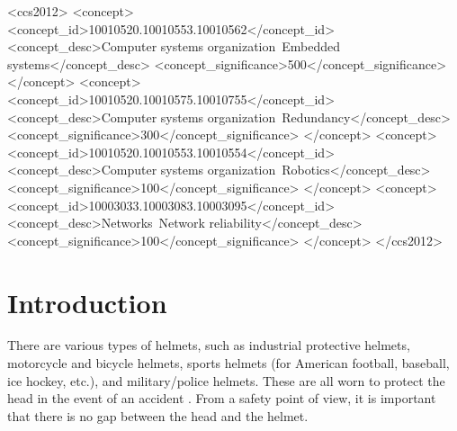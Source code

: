 \documentclass[sigconf,authordraft]{acmart}
\begin{document}
\begin{CCSXML}
<ccs2012>
 <concept>
  <concept_id>10010520.10010553.10010562</concept_id>
  <concept_desc>Computer systems organization~Embedded systems</concept_desc>
  <concept_significance>500</concept_significance>
 </concept>
 <concept>
  <concept_id>10010520.10010575.10010755</concept_id>
  <concept_desc>Computer systems organization~Redundancy</concept_desc>
  <concept_significance>300</concept_significance>
 </concept>
 <concept>
  <concept_id>10010520.10010553.10010554</concept_id>
  <concept_desc>Computer systems organization~Robotics</concept_desc>
  <concept_significance>100</concept_significance>
 </concept>
 <concept>
  <concept_id>10003033.10003083.10003095</concept_id>
  <concept_desc>Networks~Network reliability</concept_desc>
  <concept_significance>100</concept_significance>
 </concept>
</ccs2012>
\end{CCSXML}




\maketitle

\section{Introduction}
\label{sec:introduction}
There are various types of helmets, such as industrial protective helmets, motorcycle and bicycle helmets, sports helmets (for American football, baseball, ice hockey, etc.), and military/police helmets. These are all worn to protect the head in the event of an accident \cite{helmet}. From a safety point of view, it is important that there is no gap between the head and the helmet.\par
\end{document}
